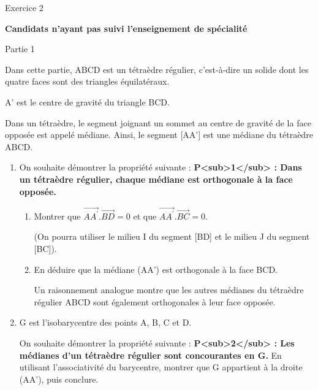
%
\begin{h2}Exercice 2\end{h2}
\textbf{Candidats n'ayant pas suivi l'enseignement de spécialité}
\begin{h3}Partie 1\end{h3}
Dans cette partie, ABCD est un tétraèdre régulier, c'est-à-dire un solide dont les quatre faces sont des triangles équilatéraux.

\begin{center}
\end{center}
A' est le centre de gravité du triangle BCD.
\par
Dans un tétraèdre, le segment joignant un sommet au centre de gravité de la face opposée est appelé médiane. Ainsi, le segment [AA'] est une médiane du tétraèdre ABCD.
\begin{enumerate}
     \item
     On souhaite démontrer la propriété suivante :
     \textbf{P<sub>1</sub> : Dans un tétraèdre régulier, chaque médiane est orthogonale à la face opposée.}
     \begin{enumerate}[label=\alph*.]
          \item
          Montrer que $\overrightarrow{AA^{\prime}} . \overrightarrow{BD}=0$ et que $\overrightarrow{AA^{\prime}} . \overrightarrow{BC}=0$.
          \par
          (On pourra utiliser le milieu I du segment [BD] et le milieu J du segment [BC]).
          \item
          En déduire que la médiane (AA') est orthogonale à la face BCD.
          \par
          Un raisonnement analogue montre que les autres médianes du tétraèdre régulier ABCD sont également orthogonales à leur face opposée.
     \end{enumerate}
     \item
     G est l'isobarycentre des points A, B, C et D.
     \par
     On souhaite démontrer la propriété suivante :
     \textbf{P<sub>2</sub> : Les médianes d'un tétraèdre régulier sont concourantes en G.}
     En utilisant l'associativité du barycentre, montrer que G appartient à la droite (AA'), puis conclure.
\end{enumerate}
